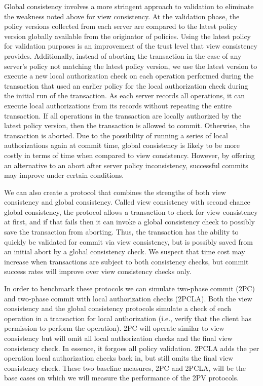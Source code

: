 \documentclass[11pt]{article}
\begin{document}
Global consistency involves a more stringent approach to validation to eliminate the weakness noted above for view consistency. At the validation phase, the policy versions collected from each server are compared to the latest policy version globally available from the originator of policies. Using the latest policy for validation purposes is an improvement of the trust level that view consistency provides. Additionally, instead of aborting the transaction in the case of any server's policy not matching the latest policy version, we use the latest version to execute a new local authorization check on each operation performed during the transaction that used an earlier policy for the local authorization check during the initial run of the transaction. As each server records all operations, it can execute local authorizations from its records without repeating the entire transaction. If all operations in the transaction are locally authorized by the latest policy version, then the transaction is allowed to commit. Otherwise, the transaction is aborted. Due to the possibility of running a series of local authorizations again at commit time, global consistency is likely to be more costly in terms of time when compared to view consistency. However, by offering an alternative to an abort after server policy inconsistency, successful commits may improve under certain conditions.

We can also create a protocol that combines the strengths of both view consistency and global consistency. Called view consistency with second chance global consistency, the protocol allows a transaction to check for view consistency at first, and if that fails then it can invoke a global consistency check to possibly save the transaction from aborting. Thus, the transaction has the ability to quickly be validated for commit via view consistency, but is possibly saved from an initial abort by a global consistency check. We suspect that time cost may increase when transactions are subject to both consistency checks, but commit success rates will improve over view consistency checks only.

In order to benchmark these protocols we can simulate two-phase commit (2PC) and two-phase commit with local authorization checks (2PCLA). Both the view consistency and the global consistency protocols simulate a check of each operation in a transaction for local authorization (i.e., verify that the client has permission to perform the operation). 2PC will operate similar to view consistency but will omit all local authorization checks and the final view consistency check. In essence, it forgoes all policy validation. 2PCLA adds the per operation local authorization checks back in, but still omits the final view consistency check. These two baseline measures, 2PC and 2PCLA, will be the base cases on which we will measure the performance of the 2PV protocols.
\end{document}
